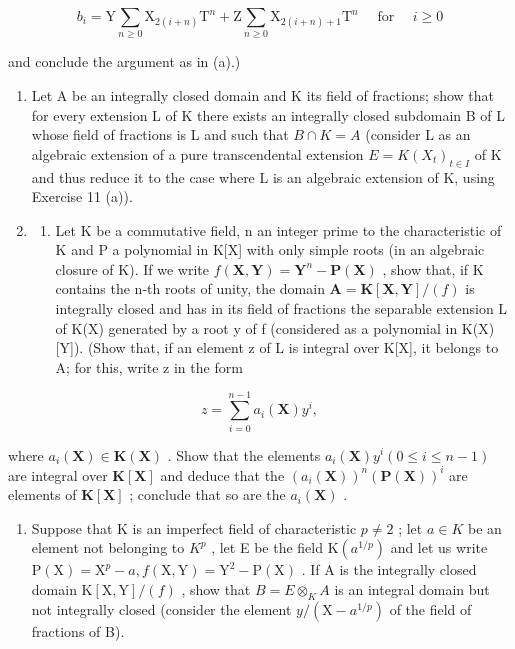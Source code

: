 \[
b _ {i} = \mathrm{Y} \sum_ {n \geqslant 0} \mathrm{X} _ {2 (i + n)} \mathrm{T} ^ {n} + \mathrm{Z} \sum_ {n \geqslant 0} \mathrm{X} _ {2 (i + n) + 1} \mathrm{T} ^ {n} \quad \text { for } \quad i \geqslant 0
\]

and conclude the argument as in (a).)

\begin{enumerate}
\def\labelenumi{\arabic{enumi}.}
\setcounter{enumi}{21}
\item
  Let A be an integrally closed domain and K its field of fractions; show that for every extension L of K there exists an integrally closed subdomain B of L whose field of fractions is L and such that \(B \cap K = A\) (consider L as an algebraic extension of a pure transcendental extension \(E = K(X_t)_{t \in I}\) of K and thus reduce it to the case where L is an algebraic extension of K, using Exercise 11 (a)).
\item
  \begin{enumerate}
  \def\labelenumii{(\alph{enumii})}
  \tightlist
  \item
    Let K be a commutative field, n an integer prime to the characteristic of K and P a polynomial in K{[}X{]} with only simple roots (in an algebraic closure of K). If we write \(f(\mathbf{X}, \mathbf{Y}) = \mathbf{Y}^{n} - \mathbf{P}(\mathbf{X})\) , show that, if K contains the n-th roots of unity, the domain \(\mathbf{A} = \mathbf{K}[\mathbf{X}, \mathbf{Y}] / (f)\) is integrally closed and has in its field of fractions the separable extension L of K(X) generated by a root y of f (considered as a polynomial in K(X){[}Y{]}). (Show that, if an element z of L is integral over K{[}X{]}, it belongs to A; for this, write z in the form
  \end{enumerate}
\end{enumerate}

\[
z = \sum_ {i = 0} ^ {n - 1} a _ {i} (\mathbf {X}) y ^ {i},
\]

where \(a_{i}(\mathbf{X}) \in \mathbf{K}(\mathbf{X})\) . Show that the elements \(a_{i}(\mathbf{X})y^{i} (0 \leqslant i \leqslant n - 1)\) are integral over \(\mathbf{K}[\mathbf{X}]\) and deduce that the \((a_{i}(\mathbf{X}))^{n}(\mathbf{P}(\mathbf{X}))^{i}\) are elements of \(\mathbf{K}[\mathbf{X}]\) ; conclude that so are the \(a_{i}(\mathbf{X})\) .

\begin{enumerate}
\def\labelenumi{(\alph{enumi})}
\setcounter{enumi}{1}
\tightlist
\item
  Suppose that K is an imperfect field of characteristic \(p \neq 2\) ; let \(a \in K\) be an element not belonging to \(K^{p}\) , let E be the field \(\mathrm{K}(a^{1/p})\) and let us write \(\mathrm{P}(\mathrm{X}) = \mathrm{X}^{p} - a, f(\mathrm{X}, \mathrm{Y}) = \mathrm{Y}^{2} - \mathrm{P}(\mathrm{X})\) . If A is the integrally closed domain \(\mathrm{K}[\mathrm{X}, \mathrm{Y}]/(f)\) , show that \(B = E \otimes_{K} A\) is an integral domain but not integrally closed (consider the element \(y/(\mathrm{X} - a^{1/p})\) of the field of fractions of B).
\end{enumerate}

